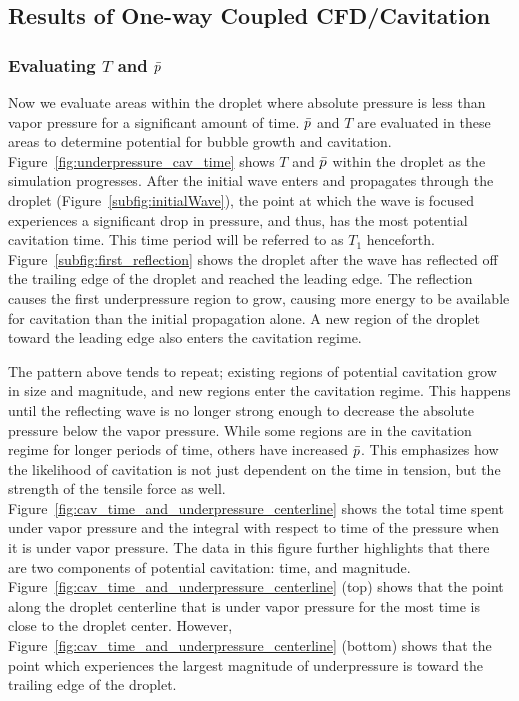 \documentclass{UCF_ETD}
\begin{document}
\subsection{Results of One-way Coupled CFD/Cavitation}

\subsubsection{Evaluating $T$ and $\Bar{p}$}

Now we evaluate areas within the droplet where absolute pressure is less than vapor pressure for a significant amount of time.
$\Bar{p}$ and $T$ are evaluated in these areas to determine potential for bubble growth and cavitation.
Figure~\ref{fig:underpressure_cav_time} shows $T$ and $\Bar{p}$ within the droplet as the simulation progresses. 
After the initial wave enters and propagates through the droplet (Figure~\ref{subfig:initialWave}), the point at which the wave is focused experiences a significant drop in pressure, and thus, has the most potential cavitation time.
This time period will be referred to as $T_{1}$ henceforth. \\

Figure~\ref{subfig:first_reflection} shows the droplet after the wave has reflected off the trailing edge of the droplet and reached the leading edge. 
The reflection causes the first underpressure region to grow, causing more energy to be available for cavitation than the initial propagation alone.
A new region of the droplet toward the leading edge also enters the cavitation regime.

The pattern above tends to repeat; existing regions of potential cavitation grow in size and magnitude, and new regions enter the cavitation regime.
This happens until the reflecting wave is no longer strong enough to decrease the absolute pressure below the vapor pressure.
While some regions are in the cavitation regime for longer periods of time, others have increased $\Bar{p}$.
This emphasizes how the likelihood of cavitation is not just dependent on the time in tension, but the strength of the tensile force as well.\\

Figure~\ref{fig:cav_time_and_underpressure_centerline} shows the total time spent under vapor pressure and the integral with respect to time of the pressure when it is under vapor pressure.
The data in this figure further highlights that there are two components of potential cavitation: time, and magnitude.
Figure~\ref{fig:cav_time_and_underpressure_centerline} (top) shows that the point along the droplet centerline that is under vapor pressure for the most time is close to the droplet center.
However, Figure~\ref{fig:cav_time_and_underpressure_centerline} (bottom) shows that the point which experiences the largest magnitude of underpressure is toward the trailing edge of the droplet.
\end{document}
